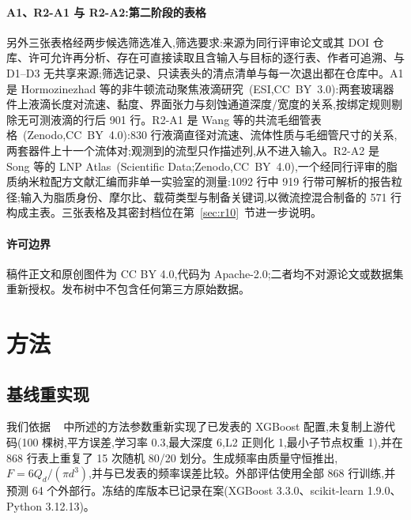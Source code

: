 \documentclass[11pt,a4paper]{ctexart}
\begin{document}
\paragraph{A1、R2-A1 与 R2-A2:第二阶段的表格} 另外三张表格经两步候选筛选准入,筛选要求:来源为同行评审论文或其 DOI 仓库、许可允许再分析、存在可直接读取且含输入与目标的逐行表、作者可追溯、与 D1--D3 无共享来源;筛选记录、只读表头的清点清单与每一次退出都在仓库中。A1 是 Hormozinezhad 等的非牛顿流动聚焦液滴研究~\cite{labchip2025dimless}(ESI,CC~BY~3.0):两套玻璃器件上液滴长度对流速、黏度、界面张力与刻蚀通道深度/宽度的关系,按绑定规则剔除无可测液滴的行后 901 行。R2-A1 是 Wang 等的共流毛细管表格~\cite{wang2024coflow}(Zenodo,CC~BY~4.0):830 行液滴直径对流速、流体性质与毛细管尺寸的关系,两套器件上十一个流体对;观测到的流型只作描述列,从不进入输入。R2-A2 是 Song 等的 LNP Atlas~\cite{lnpatlas2025}(Scientific Data;Zenodo,CC~BY~4.0),一个经同行评审的脂质纳米粒配方文献汇编而非单一实验室的测量:1092 行中 919 行带可解析的报告粒径;输入为脂质身份、摩尔比、载荷类型与制备关键词,以微流控混合制备的 571 行构成主表。三张表格及其密封档位在第~\ref{sec:r10}~节进一步说明。

\paragraph{许可边界} 稿件正文和原创图件为 CC BY 4.0,代码为 Apache-2.0;二者均不对源论文或数据集重新授权。发布树中不包含任何第三方原始数据。

\section{方法}
\label{sec:methods}

\subsection{基线重实现}
\label{sec:e0}

我们依据 ~\cite{lashkaripour2024} 中所述的方法参数重新实现了已发表的 XGBoost 配置,未复制上游代码(100 棵树,平方误差,学习率 0.3,最大深度 6,L2 正则化 1,最小子节点权重 1),并在 868 行表上重复了 15 次随机 80/20 划分。生成频率由质量守恒推出,$F = 6Q_d/(\pi d^3)$,并与已发表的频率误差比较。外部评估使用全部 868 行训练,并预测 64 个外部行。冻结的库版本已记录在案(XGBoost 3.3.0、scikit-learn 1.9.0、Python 3.12.13)。
\end{document}
